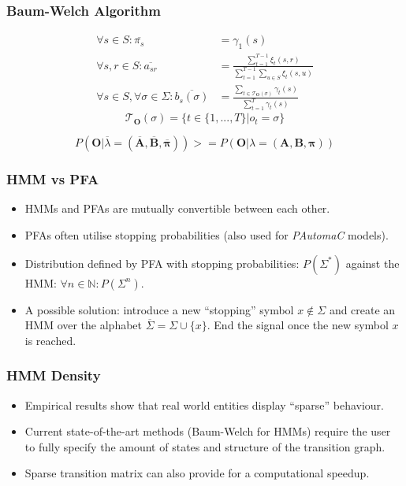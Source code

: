 \begin{frame}
	\frametitle{Baum-Welch Algorithm}
	
	\begin{align*}
		\forall s\in S: \overline{\pi_s} &= \gamma_1(s)\\
		\forall s,r\in S: \overline{a_{sr}} &= \frac{\sum_{t=1}^{T-1}\xi_t(s,r)}{\sum_{t=1}^{T-1}\sum_{u\in S}\xi_t(s,u)}\\
		\forall s\in S,\forall \sigma\in\Sigma:\overline{b_{s}(\sigma)}&=\frac{\sum_{t\in\mathcal{T}_\mathbf{O}(\sigma)}\gamma_t(s)}{\sum_{t=1}^T\gamma_t(s)}
	\end{align*}
	$$\mathcal{T}_\mathbf{O}(\sigma) = \{t\in\{1,...,T\}|o_t=\sigma\}$$
	
	$$P(\mathbf{O}|\overline{\lambda}=(\mathbf{\overline{A}}, \mathbf{\overline{B}}, \boldsymbol{\overline{\pi}})) >= P(\mathbf{O}|\lambda=(\mathbf{A}, \mathbf{B}, \boldsymbol{\pi}))$$
\end{frame}

\begin{frame}
	\frametitle{HMM vs PFA}
	
	\begin{itemize}
		\item HMMs and PFAs are mutually convertible between each other.
		\item PFAs often utilise stopping probabilities (also used for \emph{PAutomaC} models).
		\item Distribution defined by PFA with stopping probabilities: $P(\Sigma^*)$ against the HMM: $\forall n\in \mathbb{N}:P(\Sigma^n)$.
		\item A possible solution: introduce a new ``stopping'' symbol $x\notin\Sigma$ and create an HMM over the alphabet $\overline{\Sigma}=\Sigma\cup\{x\}$. End the signal once the new symbol $x$ is reached.
	\end{itemize}
\end{frame}

\begin{frame}
	\frametitle{HMM Density}
	
	\begin{itemize}
		\item Empirical results show that real world entities display ``sparse'' behaviour.
		\item Current state-of-the-art methods (Baum-Welch for HMMs) require the user to fully specify the amount of states and structure of the transition graph.
		\item Sparse transition matrix can also provide for a computational speedup.
	\end{itemize}
\end{frame}